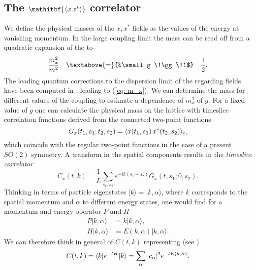 \subsection[The $\langle xx^{*}\rangle$ correlator]{The {$\mathitbf{\langle x\,x^{*}\rangle}$} correlator} \label{sec: xx_corr}
We define the physical masses of the $x,x^{*}$ fields as the values of the energy at vanishing momentum. In the large coupling limit the mass can be read off from a quadratic expansion of the  \cite{Bianchi:2016cyv} to 
%
%
\begin{equation}
\frac{m_{x}^{2}}{m^{2}} \quad \textabove{=}{$\small g \!\gg \!1$} \quad \frac{1}{2}.
\end{equation}
%
%
The leading quantum corrections to the dispersion limit of the regarding fields have been computed in \cite{Giombi:2010bj}, leading to (\ref{eq: m_x}). We can determine the mass for different values of the coupling to estimate a dependence of $m_{x}^{2}$ of $g$. For a fixed value of $g$ one can calculate the physical mass on the lattice with timeslice correlation functions derived from the connected two-point functions
%
%
\begin{equation}
G_{x}(t_{1},s_{1};t_{2},s_{2}) = \langle x(t_{1},s_{1})\, x^{*}(t_{2},s_{2}) \rangle_{\rm c},
\end{equation}
%
%
which coincide with the regular two-point functions in the case of a present $SO(2)$ symmetry. A  transform in the spatial components results in the \textit{timeslice correlator}
%
%
\begin{equation}
C_{x}(t,k) = \frac{1}{L}\sum\limits_{s_{1},s_{2}} e^{-ik(s_{1}-s_{2})} G_{x}(t,s_{1};0,s_{2}).
\end{equation}
%
%
Thinking in terms of particle eigenstates $\vert k \rangle = \vert k,\alpha \rangle$, where $k$ corresponds to the spatial momentum and $\alpha$ to different energy states, one would find for a momentum and energy operator $P$ and $H$
%
%
\begin{align}
P \vert k,\alpha \rangle &= k \vert k,\alpha \rangle, \\
H \vert k,\alpha \rangle &= E(k,\alpha) \vert k,\alpha \rangle.
\end{align}
%
%
We can therefore think in general of $C(t,k)$ representing (see \cite{montvay_lattice})
%
%
\begin{equation}
C(t,k) = \langle k\vert e^{-tH} \vert k \rangle = \sum\limits_{\alpha} \vert c_{\alpha} \vert^{2} e^{-t E(k,\alpha)}.
\raisetag{-8pt}
\end{equation}
